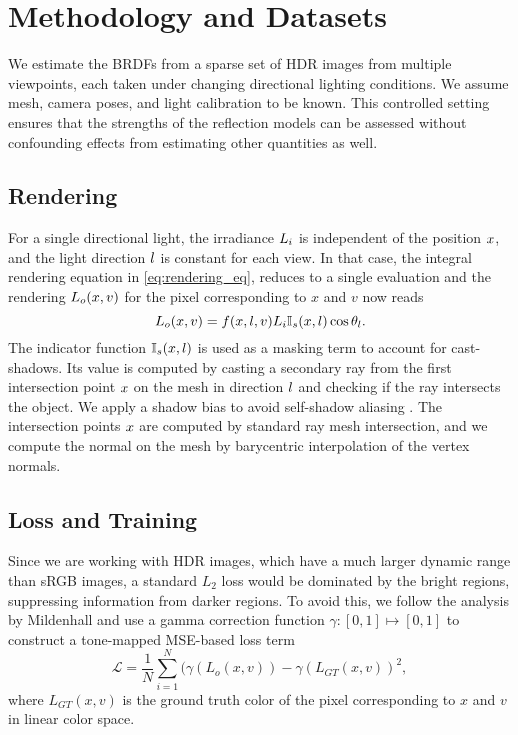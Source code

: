\section{Methodology and Datasets}
We estimate the BRDFs from a sparse set of HDR images from multiple viewpoints, each taken under changing directional lighting conditions. We assume mesh, camera poses, and light calibration to be known. This controlled setting ensures that the strengths of the reflection models can be assessed without confounding effects from estimating other quantities as well.

\subsection{Rendering}
For a single directional light, the irradiance $L_i$ is independent of the position $x$, and the light direction $l$ is constant for each view. In that case, the integral rendering equation in \cref{eq:rendering_eq}, reduces to a single evaluation and the rendering $L_o(x, v)$ for the pixel corresponding to $x$ and $v$ now reads
\begin{equation}
    \label{eq:rendering_single_dir_light}
    L_o(x, v) = f(x, l, v) L_i \mathbb{I}_s(x, l) \cos\theta_l.
\end{equation}
The indicator function $\mathbb{I}_s(x, l)$ is used as a masking term to account for cast-shadows. Its value is computed by casting a secondary ray from the first intersection point $x$ on the mesh in direction $l$ and checking if the ray intersects the object. We apply a shadow bias to avoid self-shadow aliasing \cite{akenine2019realTimeRendering}. The intersection points $x$ are computed by standard ray mesh intersection, and we compute the normal on the mesh by barycentric interpolation of the vertex normals.

\subsection{Loss and Training}
Since we are working with HDR images, which have a much larger dynamic range than sRGB images, a standard $L_2$ loss would be dominated by the bright regions, suppressing information from darker regions. To avoid this, 
we follow the analysis by Mildenhall \etal \cite{Mildenhall22NerfInTheDark} and
use a gamma correction function $\gamma: [0, 1]\mapsto [0,1]$ to construct a tone-mapped MSE-based loss term
\begin{equation}\label{eq:loss}
    \mathcal{L} = \frac{1}{N}\sum_{i=1}^N (\gamma(L_o(x, v)) - \gamma(L_{GT}(x, v))^2,
\end{equation}
where $L_{GT}(x, v)$ is the ground truth color of the pixel corresponding to $x$ and $v$ in linear color space. 

